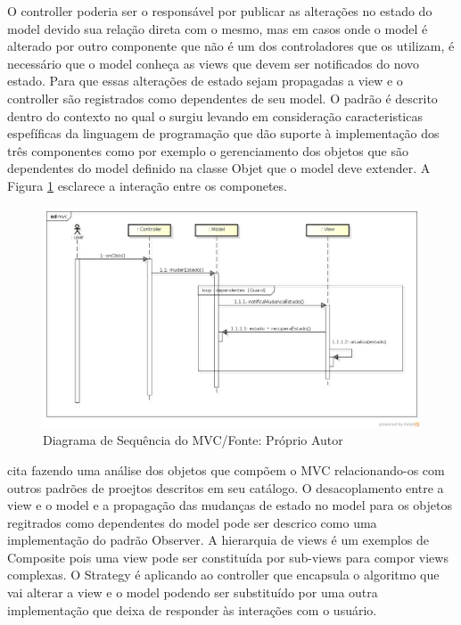 O controller poderia ser o responsável por publicar as alterações no estado do
model devido sua relação direta com o mesmo, mas em casos onde o model é
alterado por outro componente que não é um dos controladores que os utilizam, é
necessário que o model conheça as views que devem ser notificados do novo
estado. Para que essas alterações de estado sejam propagadas a view e o
controller são registrados como dependentes de seu model. O padrão é descrito
dentro do contexto no qual o surgiu levando em consideração caracteristicas
espefíficas da  linguagem de programação que dão suporte à implementação dos
três componentes como por exemplo o gerenciamento dos objetos que são
dependentes do model definido na classe Objet que o model deve extender. A
Figura \ref{mvc_seq} esclarece a interação entre os componetes.

\begin{figure}[h]
	\centering
	\includegraphics[scale=0.5]{img/mvc_seq.png}
	\caption{Diagrama de Sequência do MVC/Fonte: Próprio Autor}
	\label{mvc_seq}
\end{figure}

 cita  fazendo uma análise dos
objetos que compõem o MVC relacionando-os com outros padrões de proejtos
descritos em seu catálogo.
O desacoplamento entre a view e o model e a propagação das mudanças de estado no
model para os objetos regitrados como dependentes do model pode ser descrico
como uma implementação do padrão Observer. A hierarquia de views é um exemplos
de Composite pois uma view pode ser constituída por sub-views para compor views
complexas. O Strategy é aplicando ao controller que encapsula o algoritmo que
vai alterar a view e o model podendo ser substituído por uma outra
implementação que deixa de responder às interações com o usuário.

